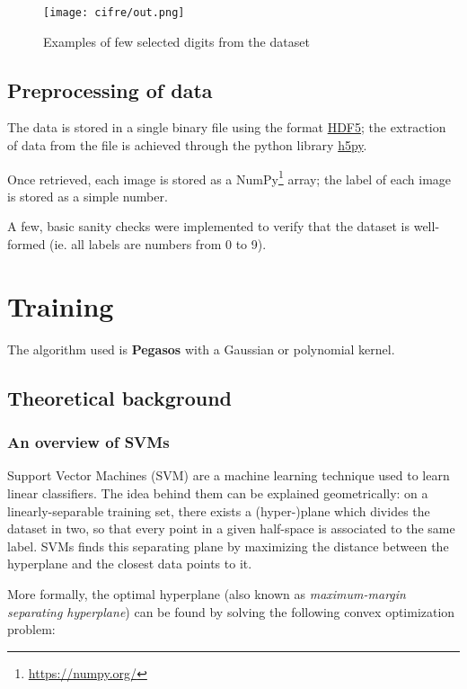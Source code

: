 \documentclass[a4paper]{article}
\begin{document}
\begin{figure}[htbp]
\centering
\texttt{[image: cifre/out.png]}
\caption[Short caption]{Examples of few selected digits from the dataset}
\end{figure}

\subsection{Preprocessing of data}
\label{sec:org05c3c13}

The data is stored in a single binary file using the format \href{https://www.hdfgroup.org/solutions/hdf5/}{HDF5}; the extraction of data from the file is achieved through the python library \href{https://www.h5py.org/}{h5py}.

Once retrieved, each image is stored as a NumPy\footnote{\url{https://numpy.org/}} array; the label of each image is stored as a simple number.

A few, basic sanity checks were implemented to verify that the dataset is well-formed (ie. all labels are numbers from 0 to 9). \cite{harris2020array}

\section{Training}
\label{sec:org0c2b9ce}

The algorithm used is \textbf{Pegasos} with a Gaussian or polynomial kernel.

\subsection{Theoretical background}
\label{sec:org2683f6f}

\subsubsection{An overview of SVMs}
\label{sec:orgdb10c1b}
\label{org857a182}
Support Vector Machines (SVM)\cite{cortes1995support} are a machine learning technique used to learn linear classifiers. The idea behind them can be explained geometrically: on a linearly-separable training set, there exists a (hyper-)plane which divides the dataset in two, so that every point in a given half-space is associated to the same label. SVMs finds this separating plane by maximizing the distance between the hyperplane and the closest data points to it.

More formally, the optimal hyperplane (also known as \emph{maximum-margin separating hyperplane}) can be found by solving the following convex optimization problem:
\end{document}
